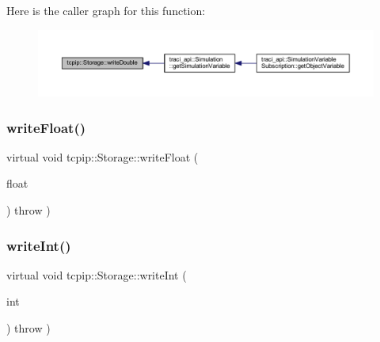 Here is the caller graph for this function\+:
\nopagebreak
\begin{figure}[H]
\begin{center}
\leavevmode
\includegraphics[width=350pt]{classtcpip_1_1_storage_afb0fc2b3b7f32ac7cba3d885965e417e_icgraph}
\end{center}
\end{figure}
\mbox{\label{classtcpip_1_1_storage_ab4fc84f48f0c54fa75bedd69d7293c4c}} 
\subsubsection{\texorpdfstring{write\+Float()}{writeFloat()}}
{\footnotesize\ttfamily virtual void tcpip\+::\+Storage\+::write\+Float (\begin{DoxyParamCaption}\item[{float}]{ }\end{DoxyParamCaption}) throw  ) \hspace{0.3cm}{\ttfamily [virtual]}}

\mbox{\label{classtcpip_1_1_storage_a1babffd3cee462277796bc5b4ef6bb1a}} 
\subsubsection{\texorpdfstring{write\+Int()}{writeInt()}}
{\footnotesize\ttfamily virtual void tcpip\+::\+Storage\+::write\+Int (\begin{DoxyParamCaption}\item[{int}]{ }\end{DoxyParamCaption}) throw  ) \hspace{0.3cm}{\ttfamily [virtual]}}

